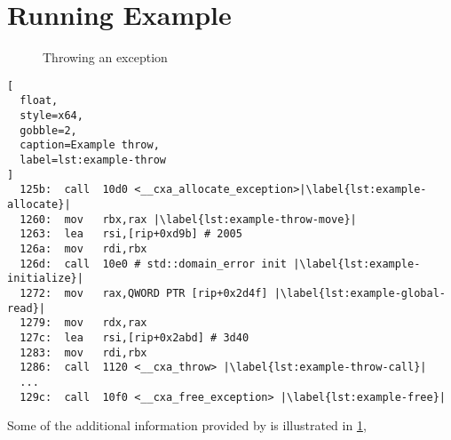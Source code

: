 \section{Running Example}\label{eicfg-example}
\begin{figure}
  \centering
  \caption{Throwing an exception}\label{fig:example-unwinding}
\end{figure}
\begin{lstlisting}[
  float,
  style=x64,
  gobble=2,
  caption=Example throw,
  label=lst:example-throw
]
  125b:  call  10d0 <__cxa_allocate_exception>|\label{lst:example-allocate}|
  1260:  mov   rbx,rax |\label{lst:example-throw-move}|
  1263:  lea   rsi,[rip+0xd9b] # 2005
  126a:  mov   rdi,rbx
  126d:  call  10e0 # std::domain_error init |\label{lst:example-initialize}|
  1272:  mov   rax,QWORD PTR [rip+0x2d4f] |\label{lst:example-global-read}|
  1279:  mov   rdx,rax
  127c:  lea   rsi,[rip+0x2abd] # 3d40
  1283:  mov   rdi,rbx
  1286:  call  1120 <__cxa_throw> |\label{lst:example-throw-call}|
  ...
  129c:  call  10f0 <__cxa_free_exception> |\label{lst:example-free}|
\end{lstlisting}
Some of the additional information provided by  is illustrated in \cref{fig:example-unwinding},
